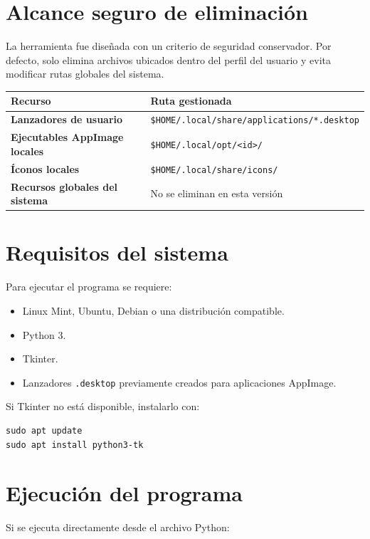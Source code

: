 \documentclass[11pt,a4paper]{article}
\begin{document}
\section{Alcance seguro de eliminación}

La herramienta fue diseñada con un criterio de seguridad conservador. Por defecto, solo elimina archivos ubicados dentro del perfil del usuario y evita modificar rutas globales del sistema.

\begin{longtable}{>{\bfseries}p{6cm}p{8cm}}
\toprule
Recurso & Ruta gestionada \\
\midrule
Lanzadores de usuario & \texttt{\$HOME/.local/share/applications/*.desktop} \\
Ejecutables AppImage locales & \texttt{\$HOME/.local/opt/<id>/} \\
Íconos locales & \texttt{\$HOME/.local/share/icons/} \\
Recursos globales del sistema & No se eliminan en esta versión \\
\bottomrule
\end{longtable}

\section{Requisitos del sistema}

Para ejecutar el programa se requiere:

\begin{itemize}[leftmargin=1.2cm]
    \item Linux Mint, Ubuntu, Debian o una distribución compatible.
    \item Python 3.
    \item Tkinter.
    \item Lanzadores \texttt{.desktop} previamente creados para aplicaciones AppImage.
\end{itemize}

Si Tkinter no está disponible, instalarlo con:

\begin{lstlisting}[style=bashstyle]
sudo apt update
sudo apt install python3-tk
\end{lstlisting}

\section{Ejecución del programa}

Si se ejecuta directamente desde el archivo Python:
\end{document}
